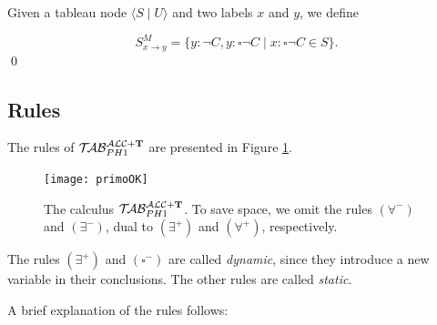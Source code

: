 \documentclass[a4paper, 11pt, oneside]{duthesis}
\newcommand{\tip}{{\bf T}}
\newcommand{\nott} {\lnot}
\newcommand{\tc} {\mid}
\newcommand{\imp} {\rightarrow}
\newcommand{\bbox}{\square}
\newcommand{\sx} {\langle}
\newcommand{\dx} {\rangle}
\newcommand{\perogni} {\forall}
\newcommand{\esiste} {\exists}
\newcommand{\Gammam}[2]{S^{M}_{#1 \imp #2}}
\newcommand{\primo}{\mathrel{{\mathcal{T}\!\mathcal{AB}}}_{PH 1}^{\mathcal{ALC}+\mbox{\scriptsize $\tip$}}}
\newenvironment{definition}
{\begin{defi} \rm}{\qed \end{defi}}
\newenvironment{definition}
{\begin{defi} \rm}{\qed \end{defi}}
\newtheorem{definition}{Definition}
\newcounter{posu}
\newtheorem{definition}[posu]{Definition}
\begin{document}
\begin{definition}
Given a tableau node $\sx S \tc U \dx$ and two labels $x$ and $y$, we define

$$\Gammam{x}{y}=\{y: \nott C, y: \bbox \nott C \tc x: \bbox \nott C \in S\}.$$
\end{definition}

\newpage

\subsection{Rules}

\noindent The rules of $\primo$ are presented in Figure \ref{immagine calcolo}.

\begin{figure}[H]{
\centerline{
	\texttt{[image: primoOK]}
	}
}
\caption{The calculus $\primo$. To save space, we omit the rules $(\perogni^-)$ and $(\esiste^-)$, dual to $(\esiste^+)$ and $(\perogni^+)$, respectively.}
\label{immagine calcolo}
\end{figure}

The rules $(\esiste^{+})$ and $(\bbox^{-})$ are called \emph{dynamic}, since they introduce a new variable in their conclusions.
The other rules are called \emph{static}.


A brief explanation of the rules follows:
\end{document}
